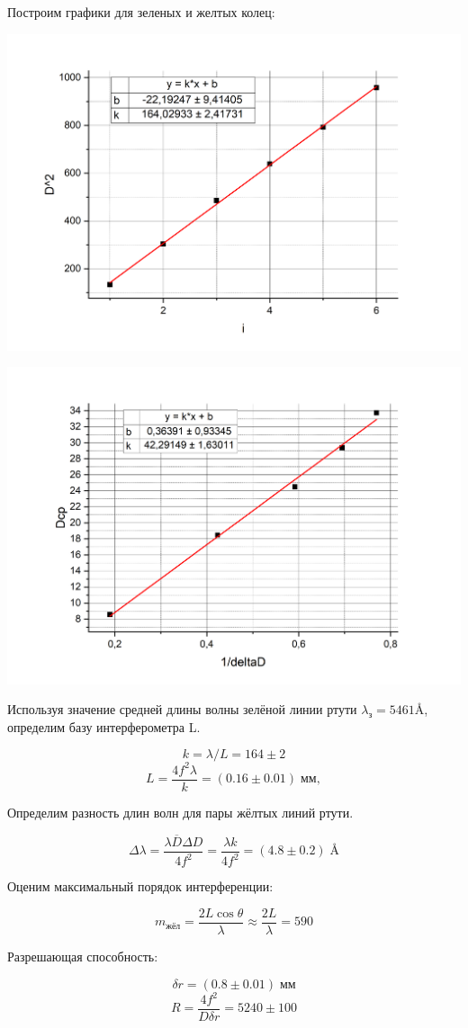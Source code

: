 \documentclass[a4paper,12pt]{article} %
\begin{document}
\noindent Построим графики для зеленых и желтых колец:

\includegraphics[width=0.9\linewidth]{gr1.png}

\includegraphics[width=0.9\linewidth]{gr2.png}

\noindent Используя значение средней длины волны зелёной линии ртути $\lambda_{\text{з}} = 5461 \text{\AA}$, определим базу интерферометра L.

 $$ k = \lambda / L = 164\pm 2 $$
\begin{equation*}\label{key}
	L=\frac{4 f^2 \lambda}{k} = (0.16 \pm 0.01)\; \text{мм},
\end{equation*}

\noindent Определим разность длин волн для пары жёлтых линий ртути.

\begin{equation*}\label{key}
	\Delta \lambda = \frac{\lambda \overline{D} \Delta D}{4 f^2} = \frac{\lambda k}{4f^2} = (4.8 \pm 0.2) \; \SI{}\text{\AA}
\end{equation*}

\noindent Оценим максимальный порядок интерференции:

\[
m_\text{жёл} = \frac{2L \cos \theta}{\lambda} \approx \frac{2L}{\lambda} = 590
\]

\noindent Разрешающая способность:

\begin{equation*}\label{key}
	 \delta r = (0.8 \pm 0.01) \;  \text{мм} 
\end{equation*}
\[ R = \frac{4f^2}{D \delta r} = 5240 \pm 100 \]

 
\end{document}
